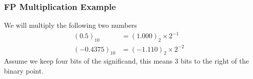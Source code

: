 \begin{frame}\frametitle{FP Multiplication Example}
We will multiply the following two numbers 
\begin{align*}
(0.5)_{10}&=(1.000)_2 \times 2^{-1}\\
(-0.4375)_{10}&=(-1.110)_2 \times 2^{-2}
\end{align*}
Assume we keep four bits of the significand, this means 3 bits to the right of the binary point.
\end{frame}







